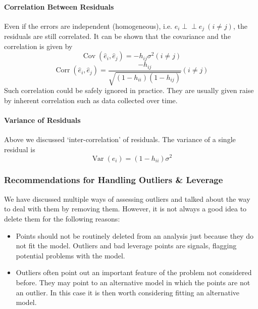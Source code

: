 \documentclass[11pt]{article}
\newcommand{\independent}{\perp \!\!\! \perp}
\begin{document}
\paragraph{Correlation Between Residuals} Even if the errors are independent (homogeneous), i.e. $e_i \independent e_j~(i \neq j)$, the residuals are still correlated. It can be shown that the covariance and the correlation is given by
\begin{equation*}
    \operatorname{Cov}\left(\hat{e}_{i}, \hat{e}_{j}\right)=-h_{i j} \sigma^{2}(i \neq j)
\end{equation*}
\begin{equation*}
    \operatorname{Corr}\left(\hat{e}_{i}, \hat{e}_{j}\right)=\frac{-h_{i j}}{\sqrt{\left(1-h_{i i}\right)\left(1-h_{i j}\right)}}(i \neq j)
\end{equation*}
Such correlation could be safely ignored in practice. They are usually given raise by inherent correlation such as data collected over time.

\paragraph{Variance of Residuals} Above we discussed `inter-correlation' of residuals. \color{BurntOrange} The variance of a single residual is
\begin{equation*}
    \operatorname{Var}\left(\hat{e}_{i}\right)=\left(1-h_{i i}\right) \sigma^{2}
\end{equation*}
\color{Black}

\subsubsection{Recommendations for Handling Outliers \& Leverage}
We have discussed multiple ways of assessing outliers and talked about the way to deal with them by removing them. However, it is not always a good idea to delete them for the following reasons:
\begin{itemize}
    \item Points should not be routinely deleted from an analysis just because they do not fit the model. Outliers and bad leverage points are signals, flagging potential problems with the model.
    \item Outliers often point out an important feature of the problem not considered before. They may point to an alternative model in which the points are not an outlier. In this case it is then worth considering fitting an alternative model. 
\end{itemize}
\end{document}
